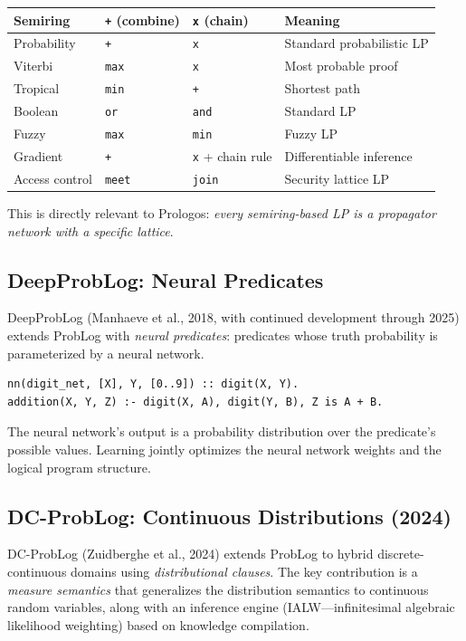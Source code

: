 \documentclass[11pt]{article}
\begin{document}
\begin{center}
\begin{tabular}{llll}
Semiring & \texttt{+} (combine) & \texttt{x} (chain) & Meaning\\
\hline
Probability & \texttt{+} & \texttt{x} & Standard probabilistic LP\\
Viterbi & \texttt{max} & \texttt{x} & Most probable proof\\
Tropical & \texttt{min} & \texttt{+} & Shortest path\\
Boolean & \texttt{or} & \texttt{and} & Standard LP\\
Fuzzy & \texttt{max} & \texttt{min} & Fuzzy LP\\
Gradient & \texttt{+} & \texttt{x} + chain rule & Differentiable inference\\
Access control & \texttt{meet} & \texttt{join} & Security lattice LP\\
\end{tabular}
\end{center}

This is directly relevant to Prologos: \emph{every semiring-based LP is a
propagator network with a specific lattice}.
\subsection{DeepProbLog: Neural Predicates}
\label{sec:orgfaee791}

DeepProbLog (Manhaeve et al., 2018, with continued development through 2025)
extends ProbLog with \emph{neural predicates}: predicates whose truth probability
is parameterized by a neural network.

\begin{verbatim}
nn(digit_net, [X], Y, [0..9]) :: digit(X, Y).
addition(X, Y, Z) :- digit(X, A), digit(Y, B), Z is A + B.
\end{verbatim}

The neural network's output is a probability distribution over the predicate's
possible values. Learning jointly optimizes the neural network weights and the
logical program structure.
\subsection{DC-ProbLog: Continuous Distributions (2024)}
\label{sec:org5255144}

DC-ProbLog (Zuidberghe et al., 2024) extends ProbLog to hybrid discrete-continuous
domains using \emph{distributional clauses}. The key contribution is a \emph{measure
semantics} that generalizes the distribution semantics to continuous random
variables, along with an inference engine (IALW---infinitesimal algebraic
likelihood weighting) based on knowledge compilation.
\end{document}
